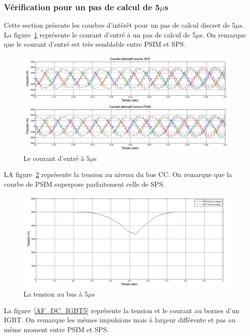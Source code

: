 \documentclass[11pt,letterpaper,final]{report}
\begin{document}
\clearpage
\subsubsection{Vérification pour un pas de calcul de 5$\mu$s}
Cette section présente les courbes d'intérêt pour un pas de calcul discret de 5$\mu$s. La figure~\ref{AF_DC_cou5} représente le courant d'entré à un pas de calcul de 5$\mu$s. On remarque que le courant d'entré est très semblable entre PSIM et SPS.
\begin{figure}[htb]
\centering
\includegraphics[scale=0.5]{Fig/DCP_AFE/5u/cour_al.jpg}
\caption{Le courant d'entré à 5$\mu$s}
\label{AF_DC_cou5}
\end{figure}

LA figure~\ref{AF_DC_vch5} représente la tension au niveau du bus CC. On remarque que la courbe de PSIM superpose parfaitement celle de SPS.

\begin{figure}[htb]
\centering
\includegraphics[scale=0.5]{Fig/DCP_AFE/5u/ten_bus.jpg}
\caption{La tension au bus à 5$\mu$s}
\label{AF_DC_vch5}
\end{figure}

La figure~\ref{AF_DC_IGBT5} représente la tension et le courant au bornes d'un IGBT. On remarque les mêmes impulsions mais à largeur différente et pas au même moment entre PSIM et SPS.
\end{document}
